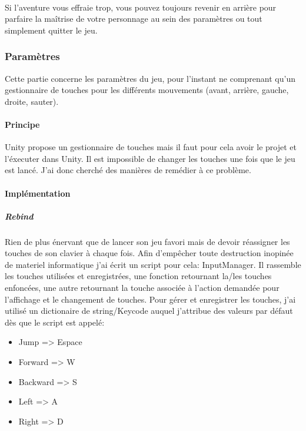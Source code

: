\documentclass{article}
\begin{document}
\paragraph{} Si l'aventure vous effraie trop, vous pouvez toujours revenir en arrière pour parfaire la maîtrise de votre personnage au sein des paramètres ou tout simplement quitter le jeu.

\subsubsection{Paramètres}
Cette partie concerne les paramètres du jeu, pour l'instant ne comprenant qu'un gestionnaire de touches pour les différents mouvements (avant, arrière, gauche, droite, sauter).

\paragraph{Principe}
Unity propose un gestionnaire de touches mais il faut pour cela avoir le projet et l'éxecuter dans Unity.
Il est impossible de changer les touches une fois que le jeu est lancé. J'ai donc cherché des manières de remédier à ce problème.

\paragraph{Implémentation}

\subparagraph{Rebind}
Rien de plus énervant que de lancer son jeu favori mais de devoir réassigner les touches de son clavier à chaque fois. Afin d'empêcher toute destruction inopinée de materiel informatique j'ai écrit un script pour cela: InputManager. Il rassemble les touches utilisées et enregistrées, une fonction retournant la/les touches enfoncées, une autre retournant la touche associée à l'action demandée pour l'affichage et le changement de touches.
\newline Pour gérer et enregistrer les touches, j'ai utilisé un dictionaire de string/Keycode auquel j'attribue des valeurs par défaut dès que le script est appelé:

\begin{itemize}
    \item Jump => Espace
    \item Forward => W
    \item Backward => S
    \item Left => A
    \item Right => D
\end{itemize}
\end{document}
